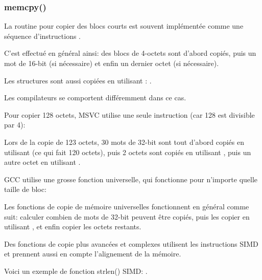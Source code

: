 \subsubsection{memcpy()}

\label{copying_short_blocks}


La routine pour copier des blocs courts est souvent implémentée comme une séquence
d'instructions \MOV.







C'est effectué en général ainsi: des blocs de 4-octets sont d'abord copiés, puis
un mot de 16-bit (si nécessaire) et enfin un dernier octet (si nécessaire).

Les structures sont aussi copiées en utilisant
\MOV: .


Les compilateurs se comportent différemment dans ce cas.




Pour copier 128 octets, MSVC utilise une seule instruction  (car 128 est
divisible par 4):



Lors de la copie de 123 octets, 30 mots de 32-bit sont tout d'abord copiés en utilisant
 (ce qui fait 120 octets), puis 2 octets sont copiés en utilisant ,
puis un autre octet en utilisant .




GCC utilise une grosse fonction universelle, qui fonctionne pour n'importe quelle
taille de bloc:




Les fonctions de copie de mémoire universelles fonctionnent en général comme suit:
calculer combien de mots de 32-bit peuvent être copiés, puis les copier en utilisant
, et enfin copier les octets restants.


Des fonctions de copie plus avancées et complexes utilisent les instructions \ac{SIMD}
et prennent aussi en compte l'alignement de la mémoire.

Voici un exemple de fonction strlen() SIMD: .

